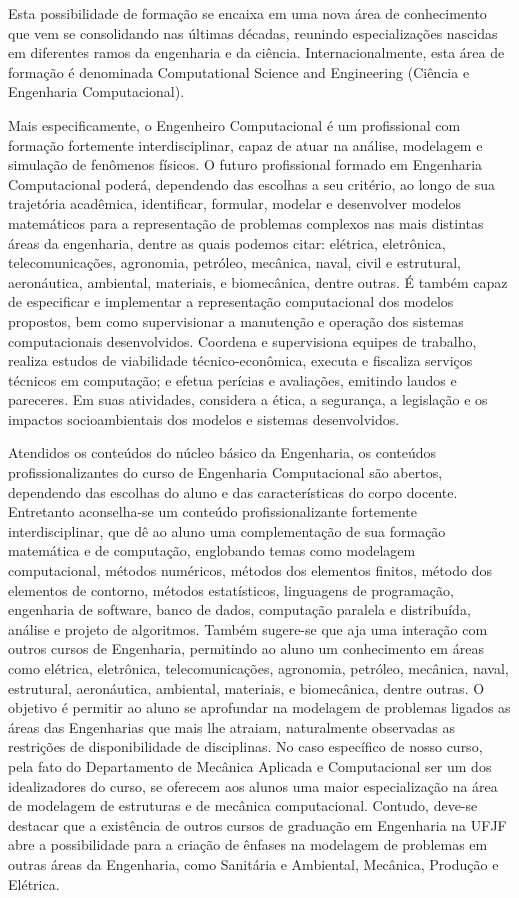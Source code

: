 Esta possibilidade de formação se encaixa em uma nova área de conhecimento que vem se consolidando nas últimas décadas, reunindo especializações nascidas em diferentes ramos da engenharia e da ciência. Internacionalmente, esta área de formação é denominada Computational Science and Engineering (Ciência e Engenharia Computacional).

Mais especificamente, o Engenheiro Computacional é um profissional com formação fortemente interdisciplinar, capaz de atuar na análise, modelagem e simulação de fenômenos físicos. O futuro profissional formado em Engenharia Computacional poderá, dependendo das escolhas a seu critério, ao longo de sua trajetória acadêmica, identificar, formular, modelar e desenvolver modelos matemáticos para a representação de problemas complexos nas mais distintas áreas da engenharia, dentre as quais podemos citar: elétrica, eletrônica, telecomunicações, agronomia, petróleo, mecânica, naval, civil e estrutural, aeronáutica, ambiental, materiais, e biomecânica, dentre outras. É também capaz de especificar e implementar a representação computacional dos modelos propostos, bem como supervisionar a manutenção e operação dos sistemas computacionais desenvolvidos. Coordena e supervisiona equipes de trabalho, realiza estudos de viabilidade técnico-econômica, executa e fiscaliza serviços técnicos em computação; e efetua perícias e avaliações, emitindo laudos e pareceres. Em suas atividades, considera a ética, a segurança, a legislação e os impactos socioambientais dos modelos e sistemas desenvolvidos.

Atendidos os conteúdos do núcleo básico da Engenharia, os conteúdos profissionalizantes do curso de Engenharia Computacional são abertos, dependendo das escolhas do aluno e das características do corpo docente. Entretanto aconselha-se um conteúdo profissionalizante fortemente interdisciplinar, que dê ao aluno uma complementação de sua formação matemática e de computação, englobando temas como modelagem computacional, métodos numéricos, métodos dos elementos finitos, método dos elementos de contorno, métodos estatísticos, linguagens de programação, engenharia de software, banco de dados, computação paralela e distribuída, análise e projeto de algoritmos. Também sugere-se que aja uma interação com outros cursos de Engenharia, permitindo ao aluno um conhecimento em áreas como elétrica, eletrônica, telecomunicações, agronomia, petróleo, mecânica, naval, estrutural, aeronáutica, ambiental, materiais, e biomecânica, dentre outras. O objetivo é permitir ao aluno se aprofundar na modelagem de problemas ligados as áreas das Engenharias que mais lhe atraiam, naturalmente observadas as restrições de disponibilidade de disciplinas. No caso específico de nosso curso, pela fato do Departamento de Mecânica Aplicada e Computacional ser um dos idealizadores do curso, se oferecem aos alunos uma maior especialização na área de modelagem de estruturas e de mecânica computacional. Contudo, deve-se destacar que a existência de outros cursos de graduação em Engenharia na UFJF abre a possibilidade para a criação de ênfases na modelagem de problemas em outras áreas da Engenharia, como Sanitária e Ambiental, Mecânica, Produção e Elétrica.

